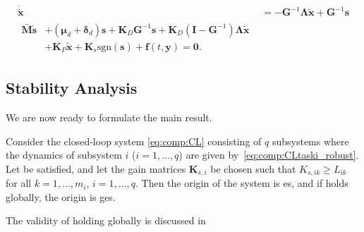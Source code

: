 \documentclass[../main.tex]{subfiles}
\begin{document}
\begin{subequations}\label{eq:comp:CL}
    \begin{align}
        \dot{\tilde{\bm{x}}} &= - \bm{G}^{-1} \bm{\Lambda} \tilde{\bm{x}} + \bm{G}^{-1} \bm{s} \label{eq:comp:CL_xtildedot}\\
        \begin{split}
        \bar{\bm{M}} \dot{\bm{s}} &+ (\bm{\mu}_{d} + \bm{\delta}_{d}) \bm{s} + \bm{K}_D \bm{G}^{-1} \bm{s} + \bm{K}_D (\bm{I} - \bm{G}^{-1} )\bm{\Lambda} \tilde{\bm{x}}\\
        &+ \bm{K}_P \tilde{\bm{x}} + \bm{K}_s \textrm{sgn}(\bm{s}) + \bm{f}(t,\bm{y}) = \bm{0} .
        \label{eq:comp:CL_sdot}
        \end{split}
    \end{align}
\end{subequations}

\subsection{Stability Analysis}
We are now ready to formulate the main result.
\begin{theorem}
    \label{prop:robust_stability}
    Consider the closed-loop system \cref{eq:comp:CL} consisting of $q$ subsystems where the dynamics of subsystem $i$ ($i=1,\ldots,q$) are given by~\eqref{eq:comp:CLtaski_robust}. Let  be satisfied, and let the gain matrices $\bm{K}_{s,i}$ be chosen such that $K_{s,ik} \geq L_{ik}$ for all $k=1,\ldots,m_i$, $i=1,\ldots,q$. Then the origin of the system is \gls{es}, and if  holds globally, the origin is \gls{ges}.
\end{theorem}
The validity of  holding globally is discussed in 
\end{document}

